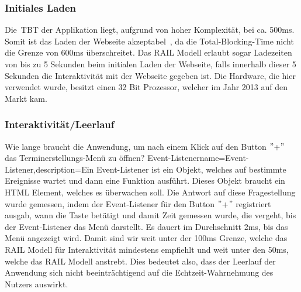 \subsubsection{Initiales Laden}\label{subsubsec:initiales-laden}
\newline
\newline
Die~\gls{TBT} der Applikation liegt, aufgrund von hoher Komplexität, bei ca. 500ms.
Somit ist das Laden der Webseite akzeptabel~\cite{TotalBlockingTime}, da die Total-Blocking-Time nicht die Grenze von 600ms überschreitet.
Das RAIL Modell erlaubt sogar Ladezeiten von bis zu 5 Sekunden beim initialen Laden der Webseite, falls innerhalb dieser 5 Sekunden die Interaktivität mit der Webseite gegeben ist.
Die Hardware, die hier verwendet wurde, besitzt einen 32 Bit Prozessor, welcher im Jahr 2013 auf den Markt kam.
\newline
\subsubsection{Interaktivität/Leerlauf}\label{subsubsec:test-1}
\newline
\newline
Wie lange braucht die Anwendung, um nach einem Klick auf den Button \("\)+\("\) das Terminerstellungs-Menü zu öffnen?
\gls{Event-Listener}{name={Event-Listener},description={Ein Event-Listener ist ein Objekt, welches auf bestimmte Ereignisse wartet und dann eine Funktion ausführt. Dieses Objekt braucht ein HTML Element, welches es überwachen soll.}}
Die Antwort auf diese Fragestellung wurde gemessen, indem der Event-Listener für den Button \("\)+\("\) registriert ausgab, wann die Taste betätigt und damit Zeit gemessen wurde, die vergeht, bis der \gls{Event-Listener} das Menü darstellt.
Es dauert im Durchschnitt 2ms, bis das Menü angezeigt wird.
Damit sind wir weit unter der 100ms Grenze, welche das RAIL Modell für Interaktivität mindestens empfiehlt und weit unter den 50ms, welche das RAIL Modell anstrebt.
Dies bedeutet also, dass der Leerlauf der Anwendung sich nicht beeinträchtigend auf die Echtzeit-Wahrnehmung des Nutzers auswirkt.
\newline
\newline
